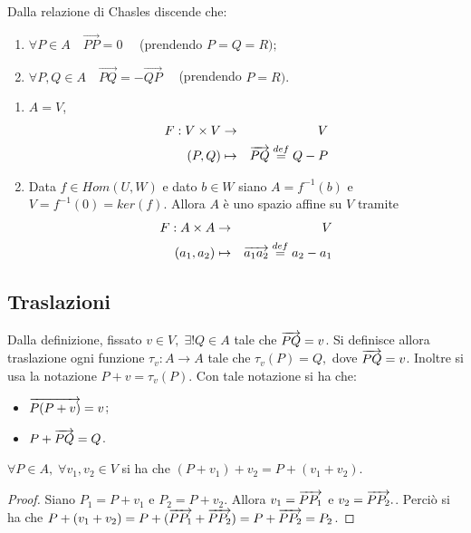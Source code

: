  \begin{remark}
 Dalla relazione di Chasles discende che: 
 \begin{enumerate}[label=\bf\alph*)]
	\item $\forall P\in A\quad\overrightarrow{PP}=0\quad$ (prendendo $P=Q=R);$
	\item $\forall P,Q\in A\quad\overrightarrow{PQ}=-\overrightarrow{QP}\quad$ (prendendo $P=R).$
 \end{enumerate}
 \end{remark}
 
 \begin{example}
	\begin{enumerate}[label=\bf\Roman*)]
 \item $A=V$,
 \begin{eqnarray*}
	F: V\times V & \to & V \\
	(P,Q) & \mapsto & \overrightarrow{PQ}\stackrel{def}{=}Q-P
 \end{eqnarray*}
 \item Data $f\in Hom(U,W)$ e dato $b\in W$ siano $A=f^{-1}(b)$ e $V=f^{-1}(0)=ker(f)$.
 Allora $A$ è uno spazio affine su $V$ tramite
 \begin{eqnarray*}
  F: A\times A & \to & V \\
  (a_1,a_2) & \mapsto & \overrightarrow{a_1a_2}\stackrel{def}{=}a_2-a_1
 \end{eqnarray*}
 \end{enumerate}
 \end{example}
 
	\subsection{Traslazioni}
 
 Dalla definizione, fissato $v\in V,\;\exists !Q\in A$ tale che $\overrightarrow{PQ}=v$.
 Si definisce allora traslazione ogni funzione $\tau_v:A\to A$ tale che $\tau_v(P)=Q,$ dove $\overrightarrow{PQ}=v$.
 Inoltre si usa la notazione $P+v=\tau_v(P)$.
 Con tale notazione si ha che:
 \begin{itemize}
	\item $\overrightarrow{P(P+v)}= {v}$;
	\item $P+\overrightarrow{PQ}=Q$.
 \end{itemize}
 
 \begin{lemma}
 $\forall P\in A,\; \forall v_1,v_2\in V$ si ha che $(P+v_1)+v_2=P+(v_1+v_2).$
 \end{lemma}
 
 \begin{proof}
 Siano $P_1=P+v_1$ e $P_2=P+v_2$. Allora $v_1=\overrightarrow{PP_1}$ e
 $v_2=\overrightarrow{PP_2}.$.
 Perciò si ha che $P+(v_1+v_2)=P+(\overrightarrow{PP_1}+\overrightarrow{PP_2})=P+\overrightarrow{PP_2}=P_2$.
 \end{proof}
 
